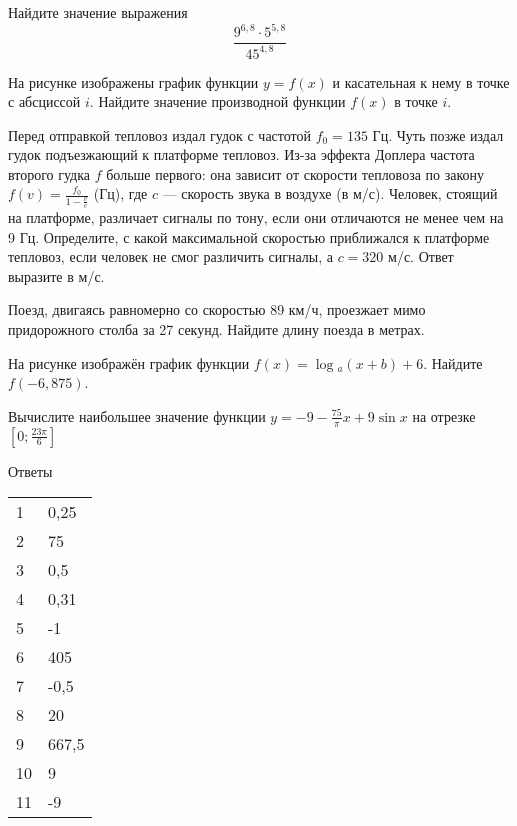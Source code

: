 \begin{taskBN}{6}
Найдите значение выражения $$\frac{9^{6,8}\cdot{5^{5,8}}}{45^{4,8}}$$
\end{taskBN}
\begin{taskBN}{7}
    На рисунке изображены график функции $y = f(x)$ и касательная к нему в точке с абсциссой $i$. Найдите значение производной функции $f(x)$ в точке $i$.
\end{taskBN}

\begin{taskBN}{8}
Перед отправкой тепловоз издал гудок с частотой $f_0 = 135$ Гц. Чуть позже издал гудок подъезжающий к платформе тепловоз. Из-за эффекта Доплера частота второго гудка $f$ больше первого: она зависит от скорости тепловоза по закону $f(v)=\frac{f_0}{1-\frac{v}{c}}$ (Гц), где $c$ — скорость звука в воздухе (в м/с). Человек, стоящий на платформе, различает сигналы по тону, если они отличаются не менее чем на 9 Гц. Определите, с какой максимальной скоростью приближался к платформе тепловоз, если человек не смог различить сигналы, а $c = 320$ м/с. Ответ выразите в м/с.
\end{taskBN}

\begin{taskBN}{9}
Поезд, двигаясь равномерно со скоростью 89 км/ч, проезжает мимо придорожного столба за 27 секунд. Найдите длину поезда в метрах.
\end{taskBN}

\begin{taskBN}{10}
На рисунке изображён график функции $f(x)=\log{_a}{(x+b)}+6$. Найдите $f(-6,875)$. 
\end{taskBN}

\begin{taskBN}{11}
Вычислите наибольшее значение функции $y = -9-\frac{75}{\pi}x+9\sin x$ на отрезке $\left[0;\frac{23\pi}{6} \right]$
\end{taskBN}

\newpage Ответы

\begin{table}\begin{tabular}{ll}
    1 & 0,25\\2 & 75\\3 & 0,5\\4 & 0,31\\5 & -1\\6 & 405\\7 & -0,5\\8 & 20\\9 & 667,5\\10 & 9\\11 & -9
\end{tabular}\end{table}